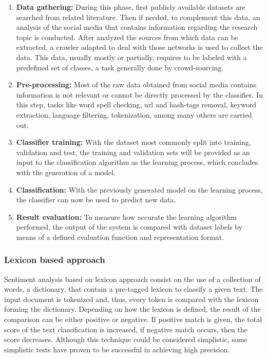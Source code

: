 \begin{enumerate}[label=\textbf{\arabic*}.]
  \item \textbf{Data gathering:} During this phase, first publicly available datasets are searched from related literature. Then if needed, to complement this data, an analysis of the social media that contains information regarding the research topic is conducted. After analyzed the sources from which data can be extracted, a crawler adapted to deal with those networks is used to collect the data. This data, usually mostly or partially, requires to be labeled with a predefined set of classes, a task generally done by crowd-sourcing.
  \item \textbf{Pre-processing:} Most of the raw data obtained from social media contains information is not relevant or cannot be directly processed by the classifier. In this step, tasks like word spell checking, \acrfull{url} and hash-tags removal, keyword extraction, language filtering, tokenization, among many others are carried out.
  \item \textbf{Classifier training:} With the dataset most commonly split into training, validation and test, the training and validation sets will be provided as an input to the classification algorithm as the learning process, which concludes with the generation of a model.
  \item \textbf{Classification:} With the previously generated model on the learning process, the classifier can now be used to predict new data.
  \item \textbf{Result evaluation:} To measure how accurate the learning algorithm performed, the output of the system is compared with dataset labels by means of a defined evaluation function and representation format.
\end{enumerate}

\subsubsection{Lexicon based approach}
\label{subsubsec:techniques_lexicon_based}

Sentiment analysis based on lexicon approach consist on the use of a collection of words, a dictionary, that contain a pre-tagged lexicon to classify a given text. The input document is tokenized and, thus, every token is compared with the lexicon forming the dictionary. Depending on how the lexicon is defined, the result of the comparison can be either positive or negative. If positive match is given, the total score of the text classification is increased, if negative match occurs, then the score decreases. Although this technique could be considered simplistic, some simplistic tests \cite{hatzivassiloglou2000effects} have proven to be successful in achieving high precision. 

